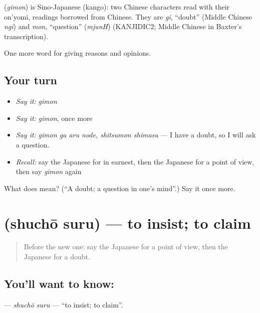 \begin{cousinweb}
\textbf{} (\emph{gimon}) is Sino-Japanese (kango): two Chinese characters read with their on'yomi, readings borrowed from Chinese. They are \emph{gi}, \textquotedblleft{}doubt\textquotedblright{} (Middle Chinese \emph{ngi}) and \emph{mon}, \textquotedblleft{}question\textquotedblright{} (\emph{mjunH}) (KANJIDIC2; Middle Chinese in Baxter's transcription).
\end{cousinweb}

\begin{grammarlens}[title={What you've built}]
One more word for giving reasons and opinions.
\end{grammarlens}

\subsection*{Your turn}
\begin{itemize}
\raggedright
  \item \emph{Say it:} \emph{gimon}
  \item \emph{Say it:} \emph{gimon}, once more
  \item \emph{Say it:} \emph{gimon ga aru node, shitsumon shimasu} — I have a doubt, so I will ask a question.
  \item \emph{Recall:} say the Japanese for in earnest, then the Japanese for a point of view, then say \emph{gimon} again
\end{itemize}

\begin{tcolorbox}[breakable,colback=teal!4,colframe=teal!35!black,title={Before you move on}]
What does  mean? (\textquotedblleft{}A doubt; a question in one's mind\textquotedblright{}.) Say it once more.
\end{tcolorbox}
\section[\texorpdfstring{\ja{しゅちょうする} (shuchō suru)}{しゅちょうする (shuchō suru)}]{ (shuchō suru) — to insist; to claim}

\label{lesson:JA-C320-shuchou-suru}



\begin{quote}
Before the new one: say the Japanese for a point of view, then the Japanese for a doubt.
\end{quote}

\subsection*{You'll want to know: }
\textbf{} — \emph{shuchō suru} — \textquotedblleft{}to insist; to claim\textquotedblright{}.


